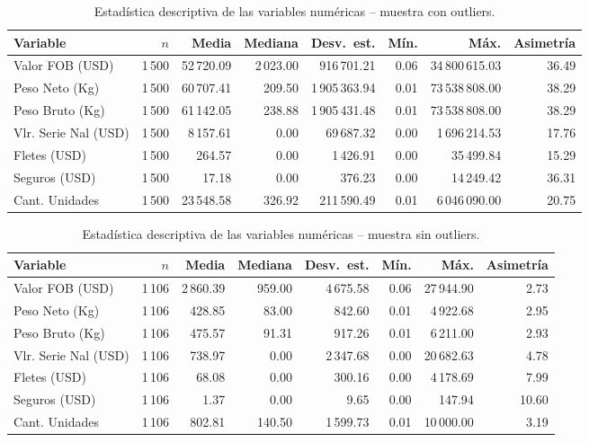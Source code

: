 \documentclass[12pt]{article}
\begin{document}
\begin{table}[htbp]
    \centering
    \caption{Estadística descriptiva de las variables numéricas -- muestra con outliers.}
    \label{tab:estad_con}
    \footnotesize
    \setlength{\tabcolsep}{4pt}
    \begin{tabular}{lrrrrrrr}
        \toprule
        Variable & $n$ & Media & Mediana & Desv.\ est. & Mín. & Máx.
        & Asimetría \\
        \midrule
        Valor FOB (USD) & 1\,500 & 52\,720.09 & 2\,023.00 & 916\,701.21 & 0.06 & 34\,800\,615.03 & 36.49 \\
        Peso Neto (Kg) & 1\,500 & 60\,707.41 & 209.50 & 1\,905\,363.94 & 0.01 & 73\,538\,808.00 & 38.29 \\
        Peso Bruto (Kg) & 1\,500 & 61\,142.05 & 238.88 & 1\,905\,431.48 & 0.01 & 73\,538\,808.00 & 38.29 \\
        Vlr. Serie Nal (USD) & 1\,500 & 8\,157.61 & 0.00 & 69\,687.32 & 0.00 & 1\,696\,214.53 & 17.76 \\
        Fletes (USD) & 1\,500 & 264.57 & 0.00 & 1\,426.91 & 0.00 & 35\,499.84 & 15.29 \\
        Seguros (USD) & 1\,500 & 17.18 & 0.00 & 376.23 & 0.00 & 14\,249.42 & 36.31 \\
        Cant. Unidades & 1\,500 & 23\,548.58 & 326.92 & 211\,590.49 & 0.01 & 6\,046\,090.00 & 20.75 \\
        \bottomrule
    \end{tabular}
\end{table}
\FloatBarrier

\begin{table}[htbp]
    \centering
    \caption{Estadística descriptiva de las variables numéricas -- muestra sin outliers.}
    \label{tab:estad_sin}
    \footnotesize
    \setlength{\tabcolsep}{4pt}
    \begin{tabular}{lrrrrrrr}
        \toprule
        Variable & $n$ & Media & Mediana & Desv.\ est. & Mín. & Máx.
        & Asimetría \\
        \midrule
        Valor FOB (USD) & 1\,106 & 2\,860.39 & 959.00 & 4\,675.58 & 0.06 & 27\,944.90 & 2.73 \\
        Peso Neto (Kg) & 1\,106 & 428.85 & 83.00 & 842.60 & 0.01 & 4\,922.68 & 2.95 \\
        Peso Bruto (Kg) & 1\,106 & 475.57 & 91.31 & 917.26 & 0.01 & 6\,211.00 & 2.93 \\
        Vlr. Serie Nal (USD) & 1\,106 & 738.97 & 0.00 & 2\,347.68 & 0.00 & 20\,682.63 & 4.78 \\
        Fletes (USD) & 1\,106 & 68.08 & 0.00 & 300.16 & 0.00 & 4\,178.69 & 7.99 \\
        Seguros (USD) & 1\,106 & 1.37 & 0.00 & 9.65 & 0.00 & 147.94 & 10.60 \\
        Cant. Unidades & 1\,106 & 802.81 & 140.50 & 1\,599.73 & 0.01 & 10\,000.00 & 3.19 \\
        \bottomrule
    \end{tabular}
\end{table}
\FloatBarrier
\end{document}
